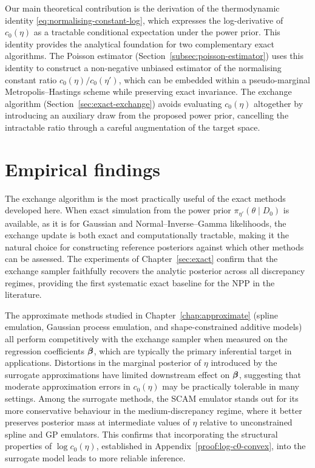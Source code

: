 Our main theoretical contribution is the derivation of the thermodynamic identity \eqref{eq:normalising-constant-log}, which expresses the log-derivative of $c_0(\eta)$ as a tractable conditional expectation under the power prior.
This identity provides the analytical foundation for two complementary exact algorithms.
The Poisson estimator (Section~\ref{subsec:poisson-estimator}) uses this identity to construct a non-negative unbiased estimator of the normalising constant ratio $c_0(\eta)/c_0(\eta')$, which can be embedded within a pseudo-marginal Metropolis--Hastings scheme while preserving exact invariance.
The exchange algorithm (Section~\ref{sec:exact-exchange}) avoids evaluating $c_0(\eta)$ altogether by introducing an auxiliary draw from the proposed power prior, cancelling the intractable ratio through a careful augmentation of the target space.

\section{Empirical findings}

The exchange algorithm is the most practically useful of the exact methods developed here.
When exact simulation from the power prior $\pi_{\eta'}(\theta \mid D_0)$ is available, as it is for Gaussian and Normal--Inverse--Gamma likelihoods, the exchange update is both exact and computationally tractable, making it the natural choice for constructing reference posteriors against which other methods can be assessed.
The experiments of Chapter~\ref{sec:exact} confirm that the exchange sampler faithfully recovers the analytic posterior across all discrepancy regimes, providing the first systematic exact baseline for the NPP in the literature.

The approximate methods studied in Chapter~\ref{chap:approximate} (spline emulation, Gaussian process emulation, and shape-constrained additive models) all perform competitively with the exchange sampler when measured on the regression coefficients $\boldsymbol{\beta}$, which are typically the primary inferential target in applications.
Distortions in the marginal posterior of $\eta$ introduced by the surrogate approximations have limited downstream effect on $\boldsymbol{\beta}$, suggesting that moderate approximation errors in $c_0(\eta)$ may be practically tolerable in many settings.
Among the surrogate methods, the SCAM emulator stands out for its more conservative behaviour in the medium-discrepancy regime, where it better preserves posterior mass at intermediate values of $\eta$ relative to unconstrained spline and GP emulators.
This confirms that incorporating the structural properties of $\log c_0(\eta)$, established in Appendix~\ref{proof:log-c0-convex}, into the surrogate model leads to more reliable inference.

